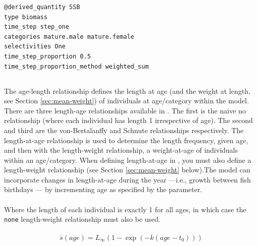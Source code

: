 {\small{\begin{verbatim}
@derived_quantity SSB
type biomass
time_step step_one
categories mature.male mature.female
selectivities One
time_step_proportion 0.5
time_step_proportion_method weighted_sum
\end{verbatim}}}

\subsection{\label{sec:age-at-age}}

The age-length relationship defines the length at age (and the weight at length, see Section \ref{sec:mean-weight}) of individuals at age/category within the model. There are three length-age relationships available in \CNAME. The first is the naive no relationship (where each individual has length 1 irrespective of age). The second  and third are the von-Bertalanffy and Schnute relationships respectively. The length-at-age relationship is used to determine the length frequency, given age, and then with the length-weight relationship, a weight-at-age of individuals within an age/category. When defining length-at-age in \CNAME, you must also define a length-weight relationship (see Section \ref{sec:mean-weight} below).The model can incorporate changes in length-at-age during the year —i.e., growth between fish birthdays — by incrementing age as specified by the  parameter.

\paragraph[None]{}
Where the length of each individual is exactly 1 for all ages, in which case the \texttt{none} length-weight relationship must also be used.

\paragraph[von Bertalanffy]{}
\begin{equation} 
\bar{s}(age)= L_\infty \left( 1 - \exp \left( -k \left(age-t_0 \right) \right) \right)
\end{equation}

